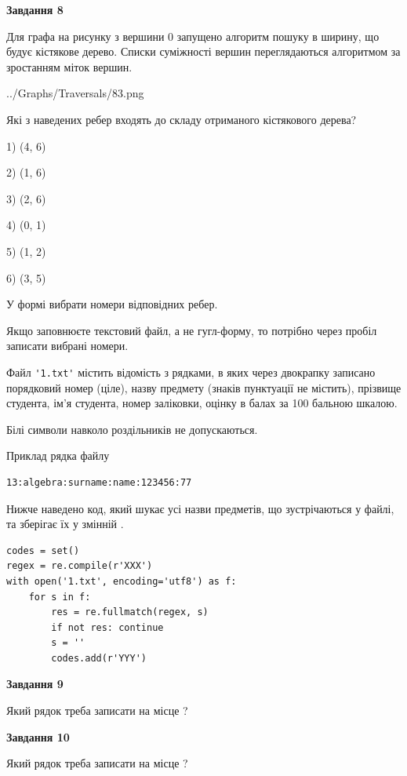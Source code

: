 \documentclass[12pt, ukrainian]{article}
\def\code#1{\Verb!#1!}
\begin{document}
{\begin {large}
{\begin {center}\textbf{Завдання 8}\end {center}}\par
Для графа на рисунку з вершини 0 запущено алгоритм пошуку в ширину, що будує кістякове дерево. Списки суміжності вершин переглядаються алгоритмом за зростанням міток вершин.\par
\begin{center}
	{../Graphs/Traversals/83.png}
\end{center}
\par Які з наведених ребер входять до складу отриманого кістякового дерева?\par
1) (4, 6)\par
2) (1, 6)\par
3) (2, 6)\par
4) (0, 1)\par
5) (1, 2)\par
6) (3, 5)\par
{\vskip 15pt} У формі вибрати номери відповідних ребер.


Якщо заповнюєте текстовий файл, а не гугл-форму, то потрібно через пробіл записа\-ти вибрані номери.\par
\newpage


Файл \code{'1.txt'} містить відомість з рядками, в яких через двокрапку записано поряд\-ковий номер (ціле), назву предмету (знаків пунктуації не містить), прізвище студента, ім'я студента, номер заліковки, оцінку в балах за 100 бальною шкалою.

Білі символи навколо роздільників не допускаються.

Приклад рядка файлу



\begin{verbatim}
13:algebra:surname:name:123456:77
\end{verbatim}


Нижче наведено код, який шукає усі назви предметів, що зустрічаються у файлі, та зберігає їх у змінній .



\begin{verbatim}
codes = set()
regex = re.compile(r'XXX')
with open('1.txt', encoding='utf8') as f:
    for s in f:
        res = re.fullmatch(regex, s)
        if not res: continue
        s = ''
        codes.add(r'YYY')
\end{verbatim}


{\begin {center}\textbf{Завдання 9}\end {center}}\par
Який рядок треба записати на місце  ?\par
\vspace{5mm}


{\begin {center}\textbf{Завдання 10}\end {center}}\par
Який рядок треба записати на місце  ?\par


\newpage


\end {large}}
\end{document}
